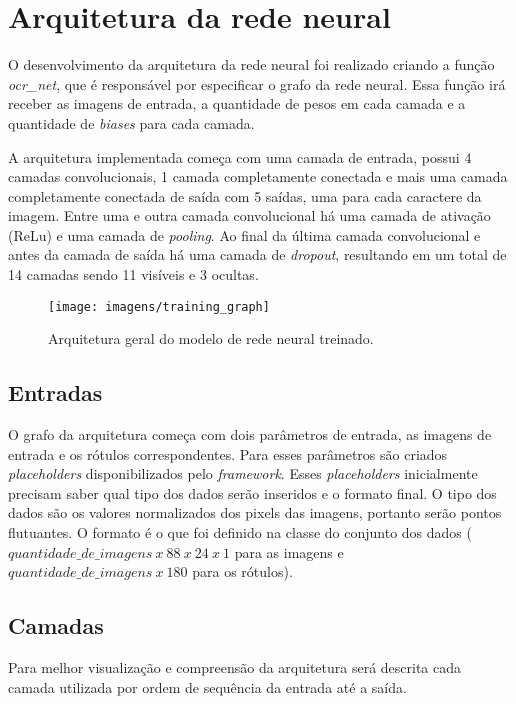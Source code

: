 \section{Arquitetura da rede neural}

O desenvolvimento da arquitetura da rede neural foi realizado criando
a função \textit{ocr\_net}, que é responsável por especificar o grafo
da rede neural. Essa função irá receber as imagens de entrada, a
quantidade de pesos em cada camada e a quantidade de \textit{biases}
para cada camada.

A arquitetura implementada começa com uma camada de entrada, possui 4
camadas convolucionais, 1 camada completamente conectada e mais uma
camada completamente conectada de saída com 5 saídas, uma para cada
caractere da imagem. Entre uma e outra camada convolucional há uma
camada de ativação (ReLu) e uma camada de \textit{pooling}. Ao final
da última camada convolucional e antes da camada de saída há uma
camada de \textit{dropout}, resultando em um total de 14 camadas sendo
11 visíveis e 3 ocultas.

\begin{figure}[H]
\centering
\texttt{[image: imagens/training\_graph]}
\caption{Arquitetura geral do modelo de rede neural treinado.}
\label{fig:training_graph}
\end{figure}

\subsection{Entradas}

O grafo da arquitetura começa com dois parâmetros de entrada, as
imagens de entrada e os rótulos correspondentes. Para esses parâmetros
são criados \textit{placeholders} disponibilizados pelo
\textit{framework}. Esses \textit{placeholders} inicialmente precisam
saber qual tipo dos dados serão inseridos e o formato final. O tipo
dos dados são os valores normalizados dos pixels das imagens, portanto
serão pontos flutuantes. O formato é o que foi definido na
classe do conjunto dos dados ($quantidade\_de\_imagens\ x\ 88\ x\ 24\
x\ 1$ para as imagens e $quantidade\_de\_imagens\ x\ 180$ para os
rótulos).

\subsection{Camadas}

Para melhor visualização e compreensão da arquitetura será descrita
cada camada utilizada por ordem de sequência da entrada até a saída.


